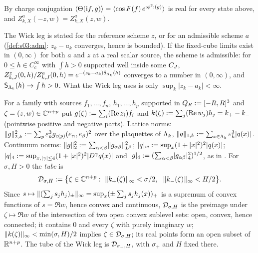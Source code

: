 By charge conjugation $\langle\Theta(\mathrm if,g)\rangle=\langle\cos F(f)\,e^{{:}\phi^2{:}(g)}\rangle$ is real for every state above, and $Z^a_{k,X}(-z,w)=Z^a_{k,X}(z,w)$.

\begin{remark}[schemes]\label{rem:s02:scheme}
The Wick leg is stated for the reference scheme $z$, or for an admissible scheme $a$ (\cref{def:s03:adm}: $z_k-a_k$ converges, hence is bounded). If the fixed-cube limits exist in $(0,\infty)$ for both $a$ and $z$ at a real scalar source, the scheme is admissible: for $0\le h\in C^\infty_c$ with $\int h>0$ supported well inside some $C_J$, $Z^z_{k,J}(0,h)/Z^a_{k,J}(0,h)=e^{-(z_k-a_k)\mathsf S_{\Lambda_k}(h)}$ converges to a number in $(0,\infty)$, and $\mathsf S_{\Lambda_k}(h)\to\int h>0$. What the Wick leg uses is only $\sup_k|z_k-a_k|<\infty$.
\end{remark}

\begin{definition}\label{def:s02:tube}
For a family with sources $f_1,\dots,f_n$, $h_1,\dots,h_p$ supported in $Q_R:=[-R,R]^3$ and $\zeta=(z,w)\in\mathbb C^{n+p}$ put $g(\zeta):=\sum_i(\operatorname{Re} z_i)f_i$ and $k(\zeta):=\sum_j(\operatorname{Re} w_j)h_j=k_+-k_-$ (pointwise positive and negative parts). Lattice norms: $\lVert g\rVert_{2,k}^2:=\sum_p\varepsilon_k^3g_{c(p)}(e_\alpha,e_\beta)^2$ over the plaquettes of $\Lambda_k$, $\lVert q\rVert_{1,k}:=\sum_{x\in\Lambda_k}\varepsilon_k^3|q(x)|$. Continuum norms: $\lVert g\rVert_2^2:=\sum_{\alpha<\beta}\lVert g_{\alpha\beta}\rVert_{L^2}^2$; $\lvert q\rvert_{w}:=\sup_x(1+|x|^2)^2|q(x)|$; $\lvert q\rvert_{4}:=\sup_{x,|\gamma|\le4}(1+|x|^2)^2|D^\gamma q(x)|$ and $\lvert g\rvert_{4}:=(\sum_{\alpha<\beta}\lvert g_{\alpha\beta}\rvert_{4}^2)^{1/2}$, as in \cite{SymPhase}. For $\sigma,H>0$ the \emph{tube} is
\[
\cD_{\sigma,H}\defeq\big\{\zeta\in\C^{n+p}:\ \norm{k_+(\zeta)}_\infty<\sigma/2,\ \ \norm{k_-(\zeta)}_\infty<H/2\big\}.
\]
Since $s\mapsto\lVert (\sum_js_jh_j)_\pm\rVert_\infty=\sup_x(\pm\sum_js_jh_j(x))_+$ is a supremum of convex functions of $s=\Re w$, hence convex and continuous, $\mathcal D_{\sigma,H}$ is the preimage under $\zeta\mapsto\Re w$ of the intersection of two open convex sublevel sets: open, convex, hence connected; it contains $0$ and every $\zeta$ with purely imaginary $w$; $\lVert k(\zeta)\rVert_\infty<\min(\sigma,H)/2$ implies $\zeta\in\mathcal D_{\sigma,H}$; its real points form an open subset of $\mathbb R^{n+p}$. The tube of the Wick leg is $\mathcal D_{\sigma_+,H}$, with $\sigma_+$ and $H$ fixed there.
\end{definition}

